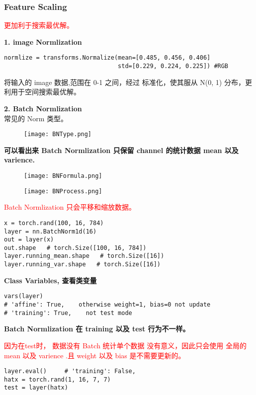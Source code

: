 \subsubsection{Feature Scaling}
\textcolor{red}{更加利于搜索最优解。}

\textbf{1. image Normlization}
\begin{lstlisting}
normlize = transforms.Normalize(mean=[0.485, 0.456, 0.406]
                                std=[0.229, 0.224, 0.225]) #RGB
\end{lstlisting}
将输入的 image 数据,范围在 0-1 之间，经过 标准化，使其服从 N(0, 1) 分布，更利用于空间搜索最优解。

\textbf{2. Batch Normlization}\\

常见的 Norm 类型。
\begin{figure}[!h]
  \centering
  \texttt{[image: BNType.png]}
\end{figure}

\textbf{可以看出来 Batch Normlization 只保留 channel 的统计数据 mean 以及 varience.}
\begin{figure}[!h]
  \centering
  \texttt{[image: BNFormula.png]}
\end{figure}
\begin{figure}[!h]
  \centering
  \texttt{[image: BNProcess.png]}
\end{figure}

\textcolor{red}{Batch Normlization 只会平移和缩放数据。}


\begin{lstlisting}
x = torch.rand(100, 16, 784)
layer = nn.BatchNorm1d(16)
out = layer(x)
out.shape   # torch.Size([100, 16, 784])
layer.running_mean.shape   # torch.Size([16])
layer.running_var.shape   # torch.Size([16])
\end{lstlisting}

\textbf{Class Variables, 查看类变量}
\begin{lstlisting}
vars(layer)
# 'affine': True,    otherwise weight=1, bias=0 not update
# 'training': True,    not test mode
\end{lstlisting}

\textbf{Batch Normlization 在 training 以及 test 行为不一样。}

\textcolor{red}{因为在test时， 数据没有 Batch 统计单个数据 没有意义，因此只会使用 全局的 mean 以及 varience .且 weight 以及 bias 是不需要更新的。}

\begin{lstlisting}
layer.eval()     # 'training': False,
hatx = torch.rand(1, 16, 7, 7)
test = layer(hatx)
\end{lstlisting}

